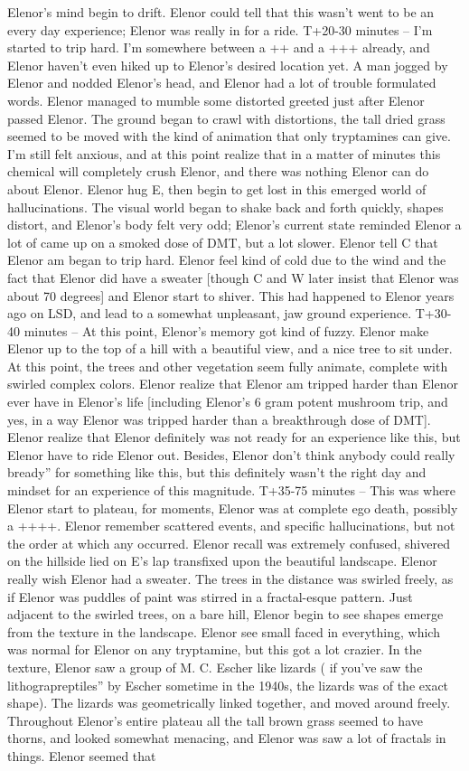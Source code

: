 \documentclass[12pt]{book}
\begin{document}
Elenor's mind begin to drift. Elenor could tell that this wasn't went to be an every day experience; Elenor was really in for a ride. T+20-30 minutes -- I'm started to trip hard. I'm somewhere between a ++ and a +++ already, and Elenor haven't even hiked up to Elenor's desired location yet. A man jogged by Elenor and nodded Elenor's head, and Elenor had a lot of trouble formulated words. Elenor managed to mumble some distorted greeted just after Elenor passed Elenor. The ground began to crawl with distortions, the tall dried grass seemed to be moved with the kind of animation that only tryptamines can give. I'm still felt anxious, and at this point realize that in a matter of minutes this chemical will completely crush Elenor, and there was nothing Elenor can do about Elenor. Elenor hug E, then begin to get lost in this emerged world of hallucinations. The visual world began to shake back and forth quickly, shapes distort, and Elenor's body felt very odd; Elenor's current state reminded Elenor a lot of came up on a smoked dose of DMT, but a lot slower. Elenor tell C that Elenor am began to trip hard. Elenor feel kind of cold due to the wind and the fact that Elenor did have a sweater [though C and W later insist that Elenor was about 70 degrees] and Elenor start to shiver. This had happened to Elenor years ago on LSD, and lead to a somewhat unpleasant, jaw ground experience. T+30-40 minutes -- At this point, Elenor's memory got kind of fuzzy. Elenor make Elenor up to the top of a hill with a beautiful view, and a nice tree to sit under. At this point, the trees and other vegetation seem fully animate, complete with swirled complex colors. Elenor realize that Elenor am tripped harder than Elenor ever have in Elenor's life [including Elenor's 6 gram potent mushroom trip, and yes, in a way Elenor was tripped harder than a breakthrough dose of DMT]. Elenor realize that Elenor definitely was not ready for an experience like this, but Elenor have to ride Elenor out. Besides, Elenor don't think anybody could really bready'' for something like this, but this definitely wasn't the right day and mindset for an experience of this magnitude. T+35-75 minutes -- This was where Elenor start to plateau, for moments, Elenor was at complete ego death, possibly a ++++. Elenor remember scattered events, and specific hallucinations, but not the order at which any occurred. Elenor recall was extremely confused, shivered on the hillside lied on E's lap transfixed upon the beautiful landscape. Elenor really wish Elenor had a sweater. The trees in the distance was swirled freely, as if Elenor was puddles of paint was stirred in a fractal-esque pattern. Just adjacent to the swirled trees, on a bare hill, Elenor begin to see shapes emerge from the texture in the landscape. Elenor see small faced in everything, which was normal for Elenor on any tryptamine, but this got a lot crazier. In the texture, Elenor saw a group of M. C. Escher like lizards ( if you've saw the lithograpreptiles'' by Escher sometime in the 1940s, the lizards was of the exact shape). The lizards was geometrically linked together, and moved around freely. Throughout Elenor's entire plateau all the tall brown grass seemed to have thorns, and looked somewhat menacing, and Elenor was saw a lot of fractals in things. Elenor seemed that 
\end{document}
